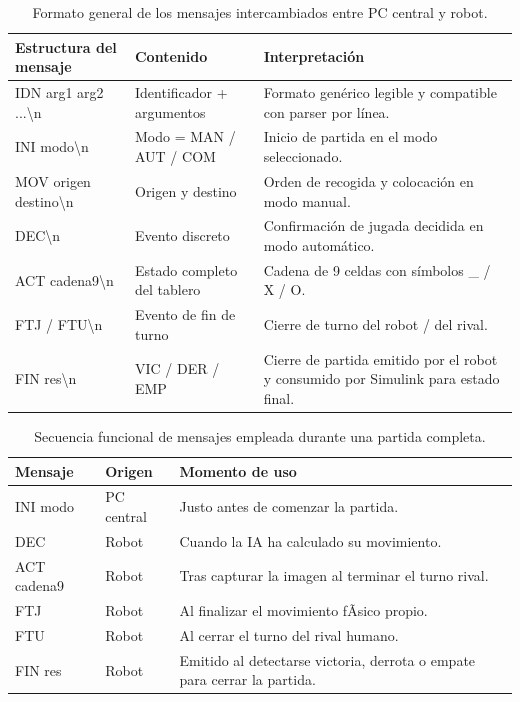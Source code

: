 \documentclass[12pt,a4paper]{article}
\begin{document}
\begin{table}[H]
\centering
\footnotesize
\begin{tabular}{P{0.25\textwidth} P{0.26\textwidth} P{0.39\textwidth}}
\toprule
\textbf{Estructura del mensaje} & \textbf{Contenido} & \textbf{Interpretación} \\
\midrule
IDN arg1 arg2 ...\textbackslash n & Identificador + argumentos & Formato genérico legible y compatible con parser por línea. \\
INI modo\textbackslash n & Modo = MAN / AUT / COM & Inicio de partida en el modo seleccionado. \\
MOV origen destino\textbackslash n & Origen y destino & Orden de recogida y colocación en modo manual. \\
DEC\textbackslash n & Evento discreto & Confirmación de jugada decidida en modo automático. \\
ACT cadena9\textbackslash n & Estado completo del tablero & Cadena de 9 celdas con símbolos \_ / X / O. \\
FTJ / FTU\textbackslash n & Evento de fin de turno & Cierre de turno del robot / del rival. \\
FIN res\textbackslash n & VIC / DER / EMP & Cierre de partida emitido por el robot y consumido por Simulink para estado final. \\
\bottomrule
\end{tabular}
\caption{Formato general de los mensajes intercambiados entre PC central y robot.}
\end{table}

\begin{table}[H]
\centering
\footnotesize
\begin{tabular}{P{0.22\textwidth} P{0.26\textwidth} P{0.42\textwidth}}
\toprule
\textbf{Mensaje} & \textbf{Origen} & \textbf{Momento de uso} \\
\midrule
INI modo & PC central & Justo antes de comenzar la partida. \\
DEC & Robot & Cuando la IA ha calculado su movimiento. \\
ACT cadena9 & Robot & Tras capturar la imagen al terminar el turno rival. \\
FTJ & Robot & Al finalizar el movimiento fÃ­sico propio. \\
FTU & Robot & Al cerrar el turno del rival humano. \\
FIN res & Robot & Emitido al detectarse victoria, derrota o empate para cerrar la partida. \\
\bottomrule
\end{tabular}
\caption{Secuencia funcional de mensajes empleada durante una partida completa.}
\end{table}
\end{document}
